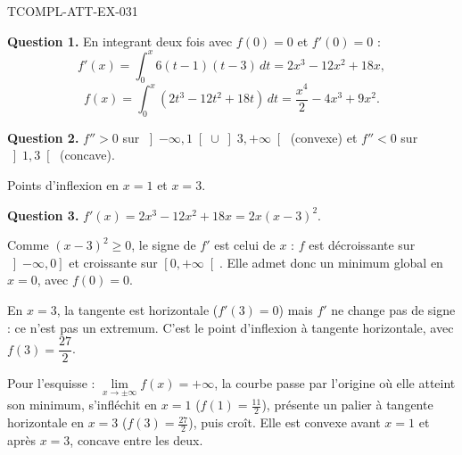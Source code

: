 \begin{corrige}{TCOMPL-ATT-EX-031}

\textbf{Question 1.} En integrant deux fois avec $f(0)=0$ et $f'(0)=0$ :
\[ f'(x) = \int_0^x 6(t-1)(t-3)\,dt = 2x^3 - 12x^2 + 18x, \]
\[ f(x) = \int_0^x (2t^3 - 12t^2 + 18t)\,dt = \frac{x^4}{2} - 4x^3 + 9x^2. \]


\textbf{Question 2.} $f'' > 0$ sur $\left]-\infty, 1\right[ \cup \left]3, +\infty\right[$ (convexe) et $f'' < 0$ sur $\left]1, 3\right[$ (concave).

Points d'inflexion en $x = 1$ et $x = 3$.

\textbf{Question 3.} $f'(x) = 2x^3 - 12x^2 + 18x = 2x(x-3)^2$.

Comme $(x-3)^2 \geq 0$, le signe de $f'$ est celui de $x$ : $f$ est décroissante
sur $\left]-\infty,0\right]$ et croissante sur $\left[0,+\infty\right[$. Elle admet
donc un minimum global en $x=0$, avec $f(0)=0$.

En $x=3$, la tangente est horizontale ($f'(3)=0$) mais $f'$ ne change pas de
signe : ce n'est pas un extremum. C'est le point d'inflexion à tangente
horizontale, avec $f(3)=\dfrac{27}{2}$.

Pour l'esquisse : $\lim\limits_{x\to\pm\infty} f(x) = +\infty$, la courbe passe par
l'origine où elle atteint son minimum, s'infléchit en $x=1$ ($f(1)=\frac{11}{2}$),
présente un palier à tangente horizontale en $x=3$ ($f(3)=\frac{27}{2}$), puis
croît. Elle est convexe avant $x=1$ et après $x=3$, concave entre les deux.

\end{corrige}
